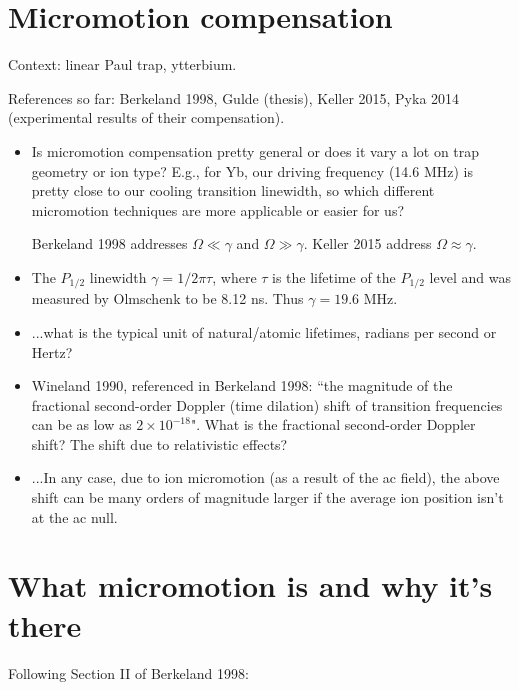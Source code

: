 \documentclass{article}
\begin{document}
\section*{Micromotion compensation}

Context: linear Paul trap, ytterbium. 

References so far: Berkeland 1998, Gulde (thesis), Keller 2015, Pyka 2014 (experimental results of their compensation).

\begin{itemize}
\item Is micromotion compensation pretty general or does it vary a lot on trap geometry or ion type? E.g., for Yb, our driving frequency (14.6 MHz) is pretty close to our cooling transition linewidth, so which different micromotion techniques are more applicable or easier for us? 

Berkeland 1998 addresses $\Omega \ll \gamma$ and $\Omega \gg \gamma$. Keller 2015 address $\Omega \approx \gamma$.

\item The $P_{1/2}$ linewidth $\gamma = 1/2 \pi \tau$, where $\tau$ is the lifetime of the $P_{1/2}$ level and was measured by Olmschenk to be 8.12 ns. Thus $\gamma = 19.6$ MHz.

\item ...what is the typical unit of natural/atomic lifetimes, radians per second or Hertz?
\item Wineland 1990, referenced in Berkeland 1998: ``the magnitude of the fractional second-order Doppler (time dilation) shift of transition frequencies can be as low as $2 \times 10^{-18}$". What is the fractional second-order Doppler shift? The shift due to relativistic effects?

\item ...In any case, due to ion micromotion (as a result of the ac field), the above shift can be many orders of magnitude larger if the average ion position isn't at the ac null.
\end{itemize}


\section{What micromotion is and why it's there}

Following Section II of Berkeland 1998:
\end{document}
